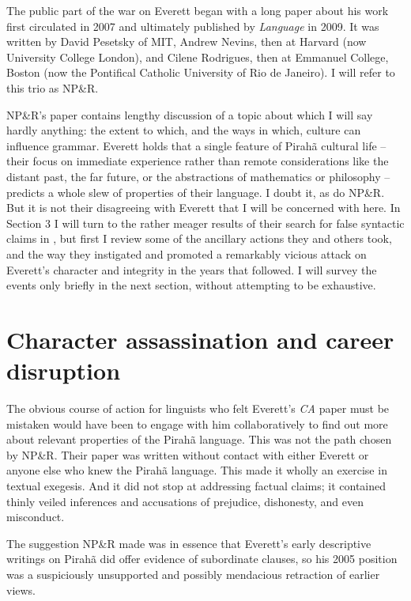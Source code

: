 \documentclass[output=paper,colorlinks,citecolor=brown
]{langscibook}
\begin{document}
The public part of the war on Everett began with a long paper about
his work first circulated in 2007 and ultimately published by
\textit{Language} in 2009. It was written by David Pesetsky of MIT,
Andrew Nevins, then at Harvard (now University College London), and
Cilene Rodrigues, then at Emmanuel College, Boston (now the Pontifical
Catholic University of Rio de Janeiro). I will refer to this trio
as NP\&R.

NP\&R's paper \citep{NevPesRod09a} contains lengthy discussion of a
topic about which I will say hardly anything: the extent to which,
and the ways in which, culture can influence grammar. Everett holds
that a single feature of Pirah{\~a} cultural life -- their focus on
immediate experience rather than remote considerations like the distant
past, the far future, or the abstractions of mathematics or philosophy
-- predicts a whole slew of properties of their language. I doubt it,
as do NP\&R. But it is not their disagreeing with Everett that I will
be concerned with here. In Section 3 I will turn to the rather meager
results of their search for false syntactic claims in \citet{Everett05},
but first I review some of the ancillary actions they and others took,
and the way they instigated and promoted a remarkably vicious attack
on Everett's character and integrity in the years that followed.
I will survey the events only briefly in the next section, without
attempting to be exhaustive.

\section{Character assassination and career disruption}\label{war}

The obvious course of action for linguists who felt Everett's
\textit{CA} paper must be mistaken would have been to engage with
him collaboratively to find out more about relevant properties of the
Pirah{\~a} language. This was not the path chosen by NP\&R. Their
paper was written without contact with either Everett or anyone else
who knew the Pirah{\~a} language. This made it wholly an exercise in
textual exegesis. And it did not stop at addressing factual claims;
it contained thinly veiled inferences and accusations of prejudice,
dishonesty, and even misconduct.

The suggestion NP\&R made was in essence that Everett's early
descriptive writings on Pirah{\~a} did offer evidence of subordinate
clauses, so his 2005 position was a suspiciously unsupported and
possibly mendacious retraction of earlier views.
\end{document}
